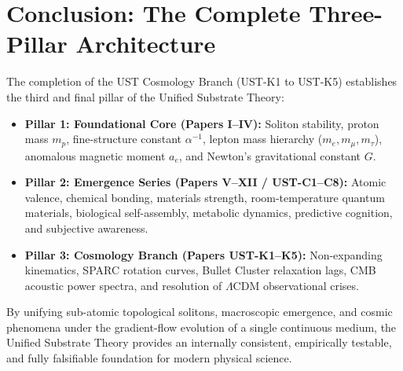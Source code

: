 \documentclass[11pt,a4paper]{article}
\begin{document}
	\section{Conclusion: The Complete Three-Pillar Architecture}
	\label{sec:conclusion}
	
	The completion of the UST Cosmology Branch (UST-K1 to UST-K5) establishes the third and final pillar of the Unified Substrate Theory:
	
	\begin{itemize}
		\item \textbf{Pillar 1: Foundational Core (Papers I--IV):} Soliton stability, proton mass $m_p$, fine-structure constant $\alpha^{-1}$, lepton mass hierarchy ($m_e, m_\mu, m_\tau$), anomalous magnetic moment $a_e$, and Newton's gravitational constant $G$.
		\item \textbf{Pillar 2: Emergence Series (Papers V--XII / UST-C1--C8):} Atomic valence, chemical bonding, materials strength, room-temperature quantum materials, biological self-assembly, metabolic dynamics, predictive cognition, and subjective awareness.
		\item \textbf{Pillar 3: Cosmology Branch (Papers UST-K1--K5):} Non-expanding kinematics, SPARC rotation curves, Bullet Cluster relaxation lags, CMB acoustic power spectra, and resolution of $\Lambda\text{CDM}$ observational crises.
	\end{itemize}
	
	By unifying sub-atomic topological solitons, macroscopic emergence, and cosmic phenomena under the gradient-flow evolution of a single continuous medium, the Unified Substrate Theory provides an internally consistent, empirically testable, and fully falsifiable foundation for modern physical science.
	
\end{document}
